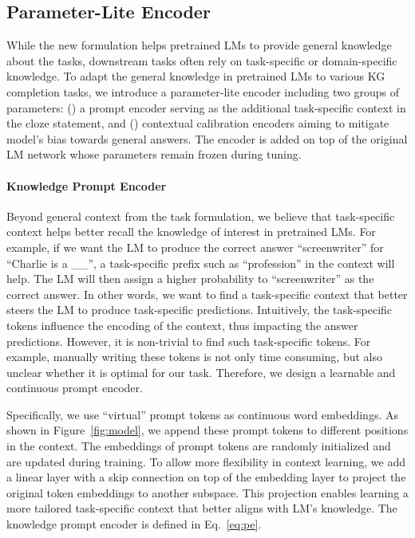 \documentclass[11pt]{article}
\begin{document}
\subsection{Parameter-Lite Encoder}
\label{sec:pl}
While the new formulation helps pretrained LMs to provide general knowledge about the tasks, downstream tasks often rely on task-specific or domain-specific knowledge. To adapt the general knowledge in pretrained LMs to various KG completion tasks, we introduce a parameter-lite encoder including two groups of parameters: (\expandafter{}) a prompt encoder serving as the additional task-specific context in the cloze statement, and (\expandafter{}) contextual calibration encoders aiming to mitigate model's bias towards general answers. The encoder is added on top of the original LM network whose parameters remain frozen during tuning.

\paragraph{Knowledge Prompt Encoder} 
Beyond general context from the task formulation, we believe that task-specific context helps better recall the knowledge of interest in pretrained LMs. For example, if we want the LM to produce the correct answer ``screenwriter'' for ``Charlie is a \_\_'', a task-specific prefix such as ``profession'' in the context will help. The LM will then assign a higher probability to ``screenwriter'' as the correct answer. In other words, we want to find a task-specific context that better steers the LM to produce task-specific predictions. Intuitively, the task-specific tokens influence the encoding of the context, thus impacting the answer predictions. However, it is non-trivial to find such task-specific tokens. For example, manually writing these tokens is not only time consuming, but also unclear whether it is optimal for our task. Therefore, we design a learnable and continuous prompt encoder.

Specifically, we use ``virtual'' prompt tokens as continuous word embeddings. As shown in Figure~\ref{fig:model}, we append these prompt tokens to different positions in the context. The embeddings of prompt tokens are randomly initialized and are updated during training. To allow more flexibility in context learning, we add a linear layer with a skip connection on top of the embedding layer to project the original token embeddings to another subspace. This projection enables learning a more tailored task-specific context that better aligns with LM's knowledge. The knowledge prompt encoder is defined in Eq.~\ref{eq:pe}.
\end{document}
